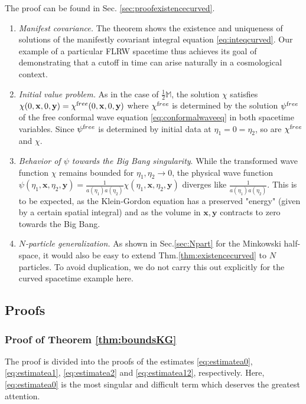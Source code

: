 \documentclass[b5paper,draft,openbib,12pt]{memoir}
\newenvironment{Remarks}[1][Remarks:]{\begin{trivlist}
\item[\hskip \labelsep {\bfseries #1}]}{\end{trivlist}}
\newcommand{\M}{\mathbb{M}}
\newcommand{\vx}{\mathbf{x}}
\newcommand{\vy}{\mathbf{y}}
\newcommand{\free}{{\textup free}}
\begin{document}
The proof can be found in Sec.\@ 
\ref{sec:proofexistencecurved}.

\begin{Remarks}
	\begin{enumerate}
    \item \textit{Manifest covariance.} The theorem 
    shows the existence and uniqueness of solutions 
    of the manifestly covariant integral equation 
    \eqref{eq:inteqcurved}. Our example of a particular 
    FLRW spacetime thus achieves its goal of 
    demonstrating that a cutoff in time can arise 
    naturally in a cosmological context.
    \item \textit{Initial value problem.} As in the 
    case of $\tfrac{1}{2}\M$, the solution $\chi$ 
    satisfies $\chi(0,\vx,0,\vy) = 
    \chi^\free(0,\vx,0,\vy)$ where $\chi^\free$ is 
    determined by the solution $\psi^\free$ of the 
    free conformal wave equation 
    \eqref{eq:conformalwaveeq} in both spacetime 
    variables. Since $\psi^\free$ is determined by 
    initial data at $\eta_1 = 0 =\eta_2$, so are 
    $\chi^\free$ and $\chi$.
    \item \textit{Behavior of $\psi$ towards the Big 
    Bang singularity}. While the transformed wave 
    function $\chi$ remains bounded for $\eta_1, 
    \eta_2 \rightarrow 0$, the physical wave function 
    $\psi(\eta_1,\vx,\eta_2,\vy) = 
    \frac{1}{a(\eta_1)a(\eta_2)} 
    \chi(\eta_1,\vx,\eta_2,\vy)$ diverges like 
    $\frac{1}{a(\eta_1)a(\eta_2)}$. This is to be 
    expected, as the Klein-Gordon equation has a 
    preserved "energy" (given by a certain spatial 
    integral) and as the volume in $\vx, \vy$ 
    contracts to zero towards the Big Bang.
    \item \textit{$N$-particle generalization.} As 
    shown in Sec.\@ \ref{sec:Npart} for the \linebreak 
    Minkowski 
    half-space, it would also be easy to extend 
    Thm.\@ \ref{thm:existencecurved} to $N$ particles. 
    To avoid duplication, we do not carry this out 
    explicitly for the curved spacetime example here.
	\end{enumerate}
\end{Remarks}


\subsection{Proofs}
\label{sec:proofs}

\subsubsection{Proof of Theorem \ref{thm:boundsKG}} 
\label{sec:proofbounds}
The proof is divided into the proofs of the estimates 
\eqref{eq:estimatea0}, \eqref{eq:estimatea1}, 
\eqref{eq:estimatea2} and \eqref{eq:estimatea12}, 
respectively. Here, \eqref{eq:estimatea0} is the most 
singular and difficult term which deserves the greatest 
attention.
\end{document}
